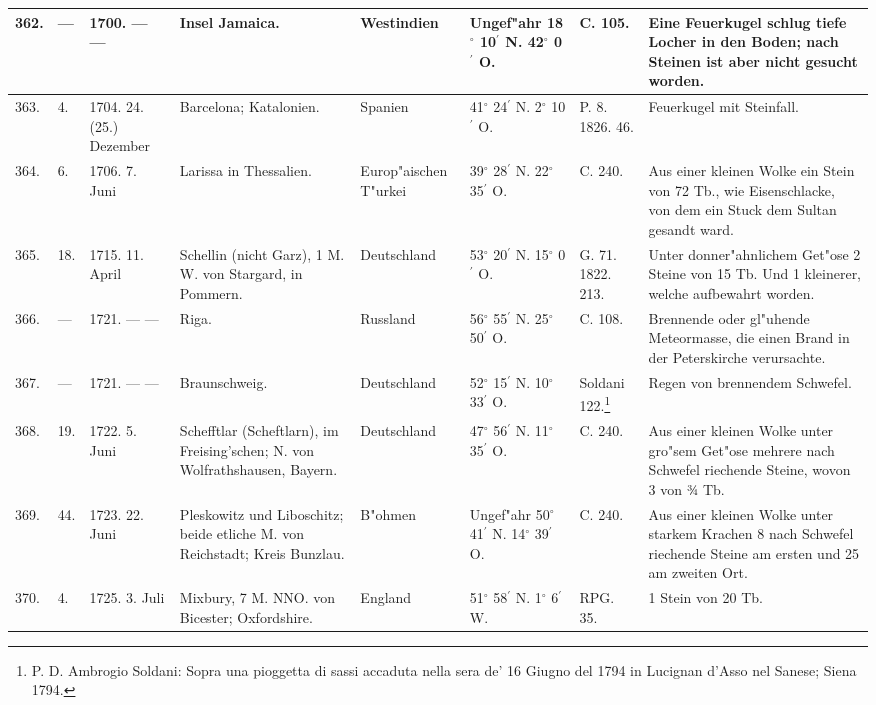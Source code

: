 \documentclass[a4paper, 8pt, oneside, polutonikogreek, german]{article}
\begin{document}
\begin{center}
\begin{longtable}{| p{5mm} | p{3mm} | p{15mm} | p{25mm} | p{20mm} | p{14mm} | p{17mm} | p{24mm} |}
        362. & --- & 1700. --- --- & Insel Jamaica. & Westindien & Ungef"ahr 18$^\circ$ 10$^\prime$ N. 42$^\circ$ 0$^\prime$ O. & C. 105. & Eine Feuerkugel schlug tiefe Locher in den Boden; nach Steinen ist aber nicht gesucht worden. \\ \hline
        363. & 4. & 1704. 24. (25.) Dezember & Barcelona; Katalonien. & Spanien & 41$^\circ$ 24$^\prime$ N. 2$^\circ$ 10$^\prime$ O. & P. 8. 1826. 46. & Feuerkugel mit Steinfall. \\ \hline
        364. & 6. & 1706. 7. Juni & Larissa in Thessalien. & Europ"aischen T"urkei & 39$^\circ$ 28$^\prime$ N. 22$^\circ$ 35$^\prime$ O. & C. 240. & Aus einer kleinen Wolke ein Stein von 72 Tb., wie Eisenschlacke, von dem ein Stuck dem Sultan gesandt ward. \\ \hline
        365. & 18. & 1715. 11. April & Schellin (nicht Garz), 1 M. W. von Stargard, in Pommern. & Deutschland & 53$^\circ$ 20$^\prime$ N. 15$^\circ$ 0$^\prime$ O. & G. 71. 1822. 213. & Unter donner"ahnlichem Get"ose 2 Steine von 15 Tb. Und 1 kleinerer, welche aufbewahrt worden. \\ \hline
        366. & --- & 1721. --- --- & Riga. & Russland & 56$^\circ$ 55$^\prime$ N. 25$^\circ$ 50$^\prime$ O. & C. 108. & Brennende oder gl"uhende Meteormasse, die einen Brand in der Peterskirche verursachte. \\ \hline
        367. & --- & 1721. --- --- & Braunschweig. & Deutschland & 52$^\circ$ 15$^\prime$ N. 10$^\circ$ 33$^\prime$ O. & Soldani 122.\footnote{P. D. Ambrogio Soldani: Sopra una pioggetta di sassi accaduta nella sera de' 16 Giugno del 1794 in Lucignan d'Asso nel Sanese; Siena 1794.} & Regen von brennendem Schwefel. \\ \hline
        368. & 19. & 1722. 5. Juni & Schefftlar (Scheftlarn), im Freising’schen; N. von Wolfrathshausen, Bayern. & Deutschland & 47$^\circ$ 56$^\prime$ N. 11$^\circ$ 35$^\prime$ O. & C. 240. & Aus einer kleinen Wolke unter gro"sem Get"ose mehrere nach Schwefel riechende Steine, wovon 3 von ¾ Tb. \\ \hline
        369. & 44. & 1723. 22. Juni & Pleskowitz und Liboschitz; beide etliche M. von Reichstadt; Kreis Bunzlau. & B"ohmen & Ungef"ahr 50$^\circ$ 41$^\prime$ N. 14$^\circ$ 39$^\prime$ O. & C. 240. & Aus einer kleinen Wolke unter starkem Krachen 8 nach Schwefel riechende Steine am ersten und 25 am zweiten Ort. \\ \hline
        370. & 4. & 1725. 3. Juli & Mixbury, 7 M. NNO. von Bicester; Oxfordshire. & England & 51$^\circ$ 58$^\prime$ N. 1$^\circ$ 6$^\prime$ W. & RPG. 35. & 1 Stein von 20 Tb. \\ \hline

\end{longtable}
\end{center}
\end{document}
